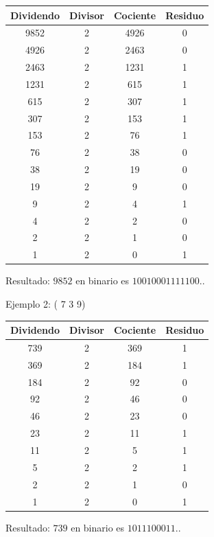 \documentclass{IEEEcsmag}
\begin{document}
\newline \begin{tabular}{|c|c|c|c|}
  \hline
  Dividendo & Divisor & Cociente & Residuo \\
  \hline
  9852 & 2 & 4926 & 0 \\
  4926 & 2 & 2463 & 0 \\
  2463 & 2 & 1231 & 1 \\
  1231 & 2 & 615 & 1 \\
  615 & 2 & 307 & 1 \\
  307 & 2 & 153 & 1 \\
  153 & 2 & 76 & 1 \\
  76 & 2 & 38 & 0 \\
  38 & 2 & 19 & 0 \\
  19 & 2 & 9 & 0 \\
  9 & 2 & 4 & 1 \\
  4 & 2 & 2 & 0 \\
  2 & 2 & 1 & 0 \\
  1 & 2 & 0 & 1 \\
  \hline
\end{tabular}
\newline 

Resultado: \(9852\) en binario es \( 10010001111100.\).
\newline


Ejemplo 2: ( 7 3 9) \newline  
\newline \begin{tabular}{|c|c|c|c|}
\hline
Dividendo & Divisor & Cociente & Residuo \\
\hline
739 & 2 & 369 & 1 \\
369 & 2 & 184 & 1 \\
184 & 2 & 92 & 0 \\
92 & 2 & 46 & 0 \\
46 & 2 & 23 & 0 \\
23 & 2 & 11 & 1 \\
11 & 2 & 5 & 1 \\
5 & 2 & 2 & 1 \\
2 & 2 & 1 & 0 \\
1 & 2 & 0 & 1 \\
\hline
\end{tabular}
\newline

Resultado: \(739\) en binario es \(1011100011.\).
\newline
\end{document}
